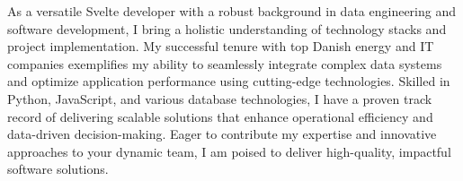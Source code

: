 
As a versatile Svelte developer with a robust background in data engineering and software development, I bring a holistic understanding of technology stacks and project implementation.
 My successful tenure with top Danish energy and IT companies exemplifies my ability to seamlessly integrate complex data systems and optimize application performance using cutting-edge technologies.
 Skilled in Python, JavaScript, and various database technologies, I have a proven track record of delivering scalable solutions that enhance operational efficiency and data-driven decision-making.
 Eager to contribute my expertise and innovative approaches to your dynamic team, I am poised to deliver high-quality, impactful software solutions.

